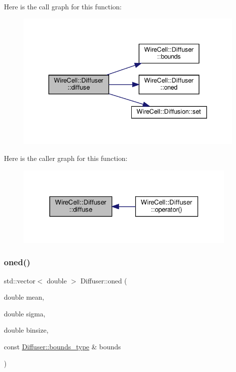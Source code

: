 Here is the call graph for this function\+:
\nopagebreak
\begin{figure}[H]
\begin{center}
\leavevmode
\includegraphics[width=330pt]{class_wire_cell_1_1_diffuser_adc579ba4d356101b4b9afdb8422087b6_cgraph}
\end{center}
\end{figure}
Here is the caller graph for this function\+:
\nopagebreak
\begin{figure}[H]
\begin{center}
\leavevmode
\includegraphics[width=306pt]{class_wire_cell_1_1_diffuser_adc579ba4d356101b4b9afdb8422087b6_icgraph}
\end{center}
\end{figure}
\mbox{\label{class_wire_cell_1_1_diffuser_a19e1586fdca351c264970065699e9c39}} 
\subsubsection{\texorpdfstring{oned()}{oned()}}
{\footnotesize\ttfamily std\+::vector$<$ double $>$ Diffuser\+::oned (\begin{DoxyParamCaption}\item[{double}]{mean,  }\item[{double}]{sigma,  }\item[{double}]{binsize,  }\item[{const \hyperlink{class_wire_cell_1_1_diffuser_a5ec949c1c222b25d1db6542dacc6d983}{Diffuser\+::bounds\+\_\+type} \&}]{bounds }\end{DoxyParamCaption})}


